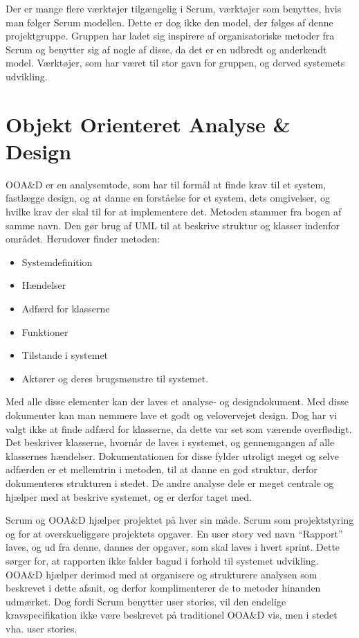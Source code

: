 Der er mange flere værktøjer tilgængelig i Scrum, værktøjer som benyttes, hvis man følger Scrum modellen.
Dette er dog ikke den model, der følges af denne projektgruppe.
Gruppen har ladet sig inspirere af organisatoriske metoder fra Scrum og benytter sig af nogle af disse, da det er en udbredt og anderkendt model.
Værktøjer, som har været til stor gavn for gruppen, og derved systemets udvikling.

\section{Objekt Orienteret Analyse \& Design}
OOA\&D er en analysemtode, som har til formål at finde krav til et system, fastlægge design, og at danne en forståelse for et system, dets omgivelser, og hvilke krav der skal til for at implementere det.
Metoden stammer fra bogen af samme navn.\citep{OOA&D2001}
Den gør brug af UML til at beskrive struktur og klasser indenfor området.
Herudover finder metoden:

\begin{itemize}
\item Systemdefinition
\item Hændelser
\item Adfærd for klasserne
\item Funktioner
\item Tilstande i systemet
\item Aktører og deres brugsmønstre til systemet.
\end{itemize}

Med alle disse elementer kan der laves et analyse- og designdokument.
Med disse dokumenter kan man nemmere lave et godt og velovervejet design.
Dog har vi valgt ikke at finde adfærd for klasserne, da dette var set som værende overflødigt.
Det beskriver klasserne, hvornår de laves i systemet, og gennemgangen af alle klassernes hændelser. 
Dokumentationen for disse fylder utroligt meget og selve adfærden er et mellemtrin i metoden, til at danne en god struktur, derfor dokumenteres strukturen i stedet.
De andre analyse dele er meget centrale og hjælper med at beskrive systemet, og er derfor taget med. 

Scrum og OOA\&D hjælper projektet på hver sin måde.
Scrum som projektstyring og for at overskueliggøre projektets opgaver. 
En user story ved navn ``Rapport'' laves, og ud fra denne, dannes der opgaver, som skal laves i hvert sprint. 
Dette sørger for, at rapporten ikke falder bagud i forhold til systemet udvikling.
OOA\&D hjælper derimod med at organisere og strukturere analysen som beskrevet i dette afsnit, og derfor komplimenterer de to metoder hinanden udmærket.
Dog fordi Scrum benytter user stories, vil den endelige kravspecifikation ikke være beskrevet på traditionel OOA\&D vis, men i stedet vha. user stories.









